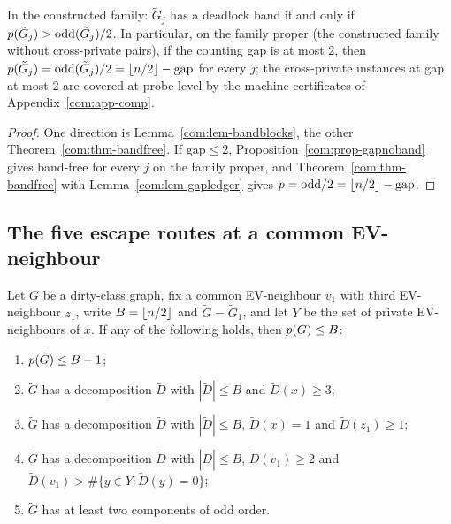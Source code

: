 \begin{corollary}\label{com:cor-bandiff}
In the constructed family: $\tilde G_j$ has a deadlock band if and only
if $p(\tilde G_j)>\mathrm{odd}(\tilde G_j)/2$. In particular, on the
family proper (the constructed family without cross-private pairs), if
the counting gap is at most $2$, then
$p(\tilde G_j)=\mathrm{odd}(\tilde G_j)/2=\left\lfloor n/2 \right\rfloor-\mathrm{gap}$ for
every $j$; the cross-private instances at gap at most $2$ are covered at
probe level by the machine certificates of Appendix~\ref{com:app-comp}.
\end{corollary}

\begin{proof}
One direction is Lemma~\ref{com:lem-bandblocks}, the other
Theorem~\ref{com:thm-bandfree}. If $\mathrm{gap}\le2$,
Proposition~\ref{com:prop-gapnoband} gives band-free for every $j$ on the
family proper, and Theorem~\ref{com:thm-bandfree} with
Lemma~\ref{com:lem-gapledger} gives
$p=\mathrm{odd}/2=\left\lfloor n/2 \right\rfloor-\mathrm{gap}$.
\end{proof}

\subsection{The five escape routes at a common EV-neighbour}

\begin{theorem}\label{com:thm-escape}
Let $G$ be a dirty-class graph, fix a common EV-neighbour $v_1$ with
third EV-neighbour $z_1$, write $B=\left\lfloor n/2 \right\rfloor$ and $\tilde G=\tilde G_1$,
and let $Y$ be the set of private EV-neighbours of $x$. If any of the
following holds, then $p(G)\le B$:
\begin{enumerate}[label=\rm(\alph*),leftmargin=2em]
\item $p(\tilde G)\le B-1$;
\item $\tilde G$ has a decomposition $\tilde D$ with $|\tilde D|\le B$ and
$\tilde D(x)\ge3$;
\item $\tilde G$ has a decomposition $\tilde D$ with $|\tilde D|\le B$,
$\tilde D(x)=1$ and $\tilde D(z_1)\ge1$;
\item $\tilde G$ has a decomposition $\tilde D$ with $|\tilde D|\le B$,
$\tilde D(v_1)\ge2$ and $\tilde D(v_1)>\#\{y\in Y:\tilde D(y)=0\}$;
\item $\tilde G$ has at least two components of odd order.
\end{enumerate}
\end{theorem}

